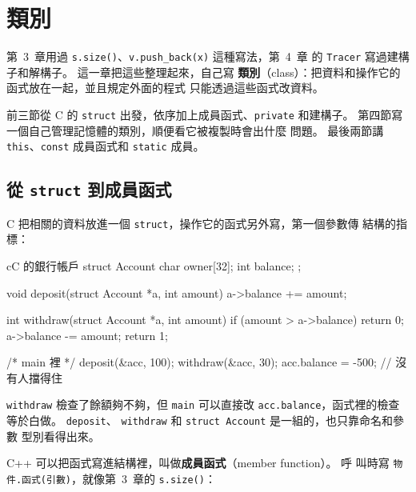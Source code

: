 \chapter{類別}
\label{ch:classes}

第~3~章用過 \texttt{s.size()}、\texttt{v.push\_back(x)} 這種寫法，第~4~章
的 \texttt{Tracer} 寫過建構子和解構子。 這一章把這些整理起來，自己寫
\textbf{類別}（class）：把資料和操作它的函式放在一起，並且規定外面的程式
只能透過這些函式改資料。

前三節從 C 的 \texttt{struct} 出發，依序加上成員函式、\texttt{private}
和建構子。 第四節寫一個自己管理記憶體的類別，順便看它被複製時會出什麼
問題。 最後兩節講 \texttt{this}、\texttt{const} 成員函式和
\texttt{static} 成員。

\section{從 \texttt{struct} 到成員函式}
\label{sec:member-func}

\begin{crecap}
C 把相關的資料放進一個 \texttt{struct}，操作它的函式另外寫，第一個參數傳
結構的指標：

\begin{code}{c}{C 的銀行帳戶}
struct Account {
    char owner[32];
    int balance;
};

void deposit(struct Account *a, int amount) {
    a->balance += amount;
}

int withdraw(struct Account *a, int amount) {
    if (amount > a->balance) {
        return 0;
    }
    a->balance -= amount;
    return 1;
}

/* main 裡 */
deposit(&acc, 100);
withdraw(&acc, 30);
acc.balance = -500;        // 沒有人擋得住
\end{code}

\texttt{withdraw} 檢查了餘額夠不夠，但 \texttt{main} 可以直接改
\texttt{acc.balance}，函式裡的檢查等於白做。 \texttt{deposit}、
\texttt{withdraw} 和 \texttt{struct Account} 是一組的，也只靠命名和參數
型別看得出來。
\end{crecap}

C++ 可以把函式寫進結構裡，叫做\textbf{成員函式}（member function）。 呼
叫時寫 \texttt{物件.函式(引數)}，就像第~3~章的 \texttt{s.size()}：

